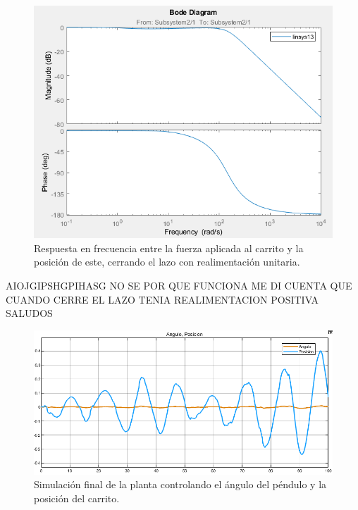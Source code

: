 \begin{figure}[H]
	\centering
	\includegraphics[width=0.8\linewidth]{bode_cerrando_p}
	\caption{Respuesta en frecuencia entre la fuerza aplicada al carrito y la posición de este, cerrando el lazo con realimentación unitaria.}
	\label{bode_cerrando_p}
\end{figure}

AIOJGIPSHGPIHASG NO SE POR QUE FUNCIONA ME DI CUENTA QUE CUANDO CERRE EL LAZO TENIA REALIMENTACION POSITIVA SALUDOS

\begin{figure}[H]
	\centering
	\includegraphics[width=0.8\linewidth]{simulacion_final}
	\caption{Simulación final de la planta controlando el ángulo del péndulo y la posición del carrito.}
	\label{simulacion_solo_angulo}
\end{figure}


